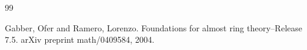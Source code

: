 \begin{thebibliography}{99}

Gabber, Ofer and Ramero, Lorenzo.
\newblock Foundations for almost ring theory--Release 7.5.
\newblock arXiv preprint math/0409584, 2004.

\end{thebibliography}
